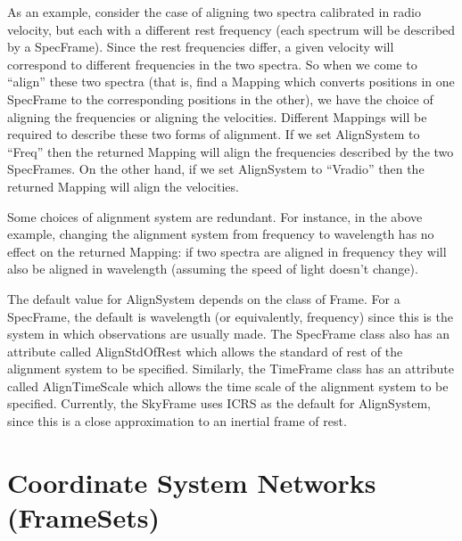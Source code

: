 \documentclass[twoside,11pt]{starlink}
\begin{document}
As an example, consider the case of aligning two spectra calibrated in
radio velocity, but each with a different rest frequency (each spectrum
will be described by a SpecFrame). Since the rest frequencies differ, a
given velocity will correspond to different frequencies in the two
spectra. So when we come to ``align'' these two spectra (that is, find a
Mapping which converts positions in one SpecFrame to the corresponding
positions in the other), we have the choice of aligning the frequencies
or aligning the velocities. Different Mappings will be required to
describe these two forms of alignment. If we set AlignSystem to ``Freq''
then the returned Mapping will align the frequencies described by the two
SpecFrames. On the other hand, if we set AlignSystem to ``Vradio''
then the returned Mapping will align the velocities.

Some choices of alignment system are redundant. For instance, in the
above example, changing the alignment system from frequency to wavelength
has no effect on the returned Mapping: if two spectra are aligned in
frequency they will also be aligned in wavelength (assuming the speed of
light doesn't change).

The default value for AlignSystem depends on the class of Frame. For a
SpecFrame, the default is wavelength (or equivalently, frequency)
since this is the system in which observations are usually made. The
SpecFrame class also has an attribute called AlignStdOfRest which
allows the standard of rest of the alignment system to be specified.
Similarly, the TimeFrame class has an attribute called AlignTimeScale
which allows the time scale of the alignment system to be specified.
Currently, the SkyFrame uses ICRS as the default for AlignSystem, since
this is a close approximation to an inertial frame of rest.

\cleardoublepage
\section{\label{ss:framesets}Coordinate System Networks (FrameSets)}
\end{document}
